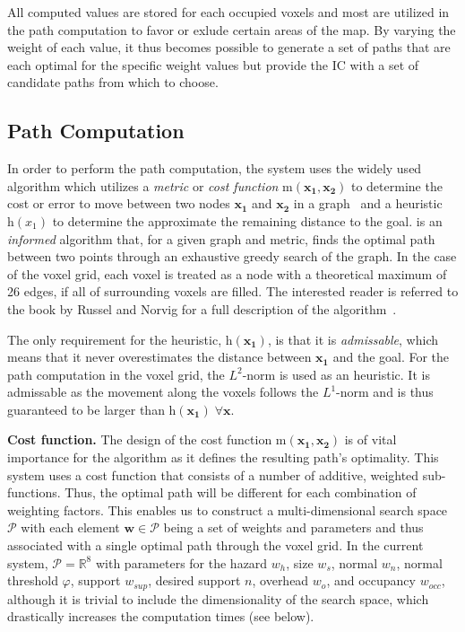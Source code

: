 All computed values are stored for each occupied voxels and most are utilized in the path computation to favor or exlude certain areas of the map.  By varying the weight of each value, it thus becomes possible to generate a set of paths that are each optimal for the specific weight values but provide the IC with a set of candidate paths from which to choose.


\subsection{Path Computation} \label{contributions:usar:binning}
In order to perform the path computation, the system uses the widely used \astar algorithm which utilizes a \emph{metric} or \emph{cost function} $\textrm{m}(\mathbf{x_1}, \mathbf{x_2})$ to determine the cost or error to move between two nodes $\mathbf{x_1}$ and $\mathbf{x_2}$ in a graph~\cite{hart1968formal} and a heuristic $\textrm{h}(x_1)$ to determine the approximate the remaining distance to the goal.  \astar is an \emph{informed} algorithm that, for a given graph and metric, finds the optimal path between two points through an exhaustive greedy search of the graph.  In the case of the voxel grid, each voxel is treated as a node with a theoretical maximum of 26 edges, if all of surrounding voxels are filled.  The interested reader is referred to the book by Russel and Norvig for a full description of the \astar algorithm~\cite{russell1995modern}.  

The only requirement for the heuristic, $\textrm{h}(\mathbf{x_1})$, is that it is \emph{admissable}, which means that it never overestimates the distance between $\mathbf{x_1}$ and the goal.  For the path computation in the voxel grid, the $L^2$-norm is used as an heuristic.  It is admissable as the movement along the voxels follows the $L^1$-norm and is thus guaranteed to be larger than $\textrm{h}(\mathbf{x_1}) \; \forall \mathbf{x}$.

\textbf{Cost function.}  The design of the cost function $\textrm{m}(\mathbf{x_1}, \mathbf{x_2})$ is of vital importance for the \astar algorithm as it defines the resulting path's optimality.  This system uses a cost function that consists of a number of additive, weighted sub-functions.  Thus, the optimal path will be different for each combination of weighting factors.  This enables us to construct a multi-dimensional search space $\mathcal{P}$ with each element $\mathbf{w} \in \mathcal{P}$ being a set of weights and parameters and thus associated with a single optimal path through the voxel grid.  In the current system, $\mathcal{P} = \mathbb{R}^8$ with parameters for the hazard $w_h$, size $w_s$, normal $w_n$, normal threshold $\varphi$, support $w_{sup}$, desired support $n$, overhead $w_o$, and occupancy $w_{occ}$, although it is trivial to include the dimensionality of the search space, which drastically increases the computation times (see below).

